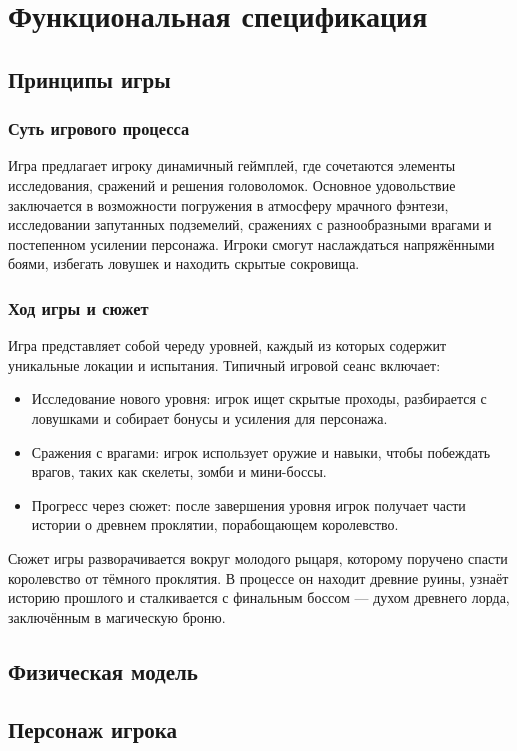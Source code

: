 \documentclass{article}
\begin{document}
\section{Функциональная спецификация}

\subsection{Принципы игры}
\subsubsection{Суть игрового процесса}
Игра предлагает игроку динамичный геймплей, где сочетаются элементы исследования, сражений и решения головоломок. Основное удовольствие заключается в возможности погружения в атмосферу мрачного фэнтези, исследовании запутанных подземелий, сражениях с разнообразными врагами и постепенном усилении персонажа. Игроки смогут наслаждаться напряжёнными боями, избегать ловушек и находить скрытые сокровища.
\subsubsection{Ход игры и сюжет}
Игра представляет собой череду уровней, каждый из которых содержит уникальные локации и испытания. Типичный игровой сеанс включает:
\begin{itemize}
    \item Исследование нового уровня: игрок ищет скрытые проходы, разбирается с ловушками и собирает бонусы и усиления для персонажа.
    \item Сражения с врагами: игрок использует оружие и навыки, чтобы побеждать врагов, таких как скелеты, зомби и мини-боссы.
    \item Прогресс через сюжет: после завершения уровня игрок получает части истории о древнем проклятии, порабощающем королевство.
\end{itemize}
Сюжет игры разворачивается вокруг молодого рыцаря, которому поручено спасти королевство от тёмного проклятия. В процессе он находит древние руины, узнаёт историю прошлого и сталкивается с финальным боссом — духом древнего лорда, заключённым в магическую броню.

\subsection{Физическая модель}

\subsection{Персонаж игрока}
\end{document}
